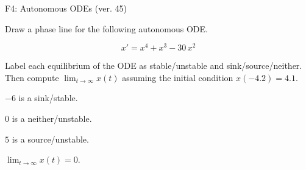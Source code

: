 \begin{exercise}
  \begin{exerciseTitle}F4: Autonomous ODEs (ver. 45)\end{exerciseTitle}
  \begin{exerciseStatement}
    

      Draw a phase line for the following 
      autonomous ODE.
    

    
\[x'= x^{4} + x^{3} - 30 \, x^{2}\]

    

      Label each equilibrium of the ODE
      as stable/unstable and sink/source/neither.
      Then compute \(\lim_{t\to\infty}x(t)\)
      assuming the initial condition
      \(x( -4.2 )= 4.1\).
    

  \end{exerciseStatement}
  \begin{exerciseAnswer}
    

      \(-6\) is a sink/stable.
      
        \(0\) is a neither/unstable.
      
      \(5\) is a source/unstable.
    

    

      \(\lim_{t\to\infty}x(t)=0\).
    

  \end{exerciseAnswer}
\end{exercise}